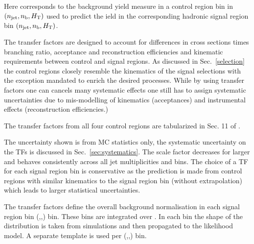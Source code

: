 Here \nobs corresponds to the background yield measure in a control region bin in $(n_{\text{jet}},n_{\text{b}},\mbox{$H_\text{T}$})$ used to predict the 
ield \npre in the corresponding hadronic signal region bin $(n_{\text{jet}},n_{\text{b}},\mbox{$H_\text{T}$})$.



The transfer factors are designed to account for differences in cross sections times branching ratio, acceptance and reconstruction efficiencies and 
kinematic requirements between control and signal regions. As discussed in Sec.~\ref{selection} the control regions closely resemble the kinematics of the signal selections with the exception mandated to enrich the desired processes. While by using transfer factors one can cancels many systematic effects one still has to assign systematic uncertainties due to mis-modelling of kinematics  (\eg acceptances) and instrumental effects (\eg reconstruction efficiencies.)


The transfer factors from all four control regions are tabularized in Sec. 11 of \cite{alphaTnote}.

%
%


The uncertainty shown is from MC statistics only, the systematic uncertainty on the TFs is discussed in Sec.~\ref{sec:systematics}.
The scale factor decreases for larger \HT and behaves consistently across all jet multiplicities and \HT bins. 
The choice of a TF for each signal region bin is conservative as the prediction is made from control regions with similar kinematics
to the signal region bin (without extrapolation) which leads to larger statistical uncertainties.

The transfer factors define the overall background normalisation in each signal region bin (\njet,\nb,\HT) bin. These bins are
integrated over \mht. In each bin the shape of the \mht distribution is taken from simulations and then propagated to the likelihood model. 
A separate \mht template is used per (\njet,\nb,\HT) bin.


